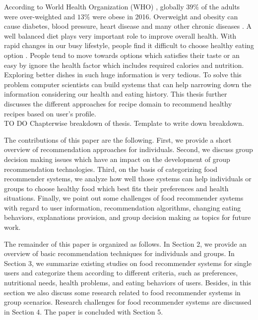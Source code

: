 According to World Health Organization (WHO) \cite{42}, globally $39\%$ of the adults were over-weighted and $13\%$ were obese in 2016. Overweight and obesity can cause diabetes, blood pressure, heart disease and many other chronic diseases \cite{43}. A well balanced diet plays very important role to improve overall health. With rapid changes in our busy lifestyle, people find it difficult to choose healthy eating option \cite{13}. People tend to move towards options which satisfies their taste or an easy by ignore the health factor which includes required calories and nutrition. Exploring better dishes in such huge information is very tedious. To solve this problem computer scientists can build systems that can help narrowing down the information considering our health and eating history. This thesis further discusses the different approaches for recipe domain to recommend healthy recipes based on user's profile.
\\

           TO DO        Chapterwise breakdown of thesis. Template to write down breakdown.

The contributions of this paper are the following. First, we provide a short overview of recommendation approaches for individuals. Second, we discuss group decision making issues which have an impact on the development of group recommendation technologies. Third, on the basis of categorizing food recommender systems, we analyze how well those systems can help individuals or groups to choose healthy food which best fits their preferences and health situations. Finally, we point out some challenges of food recommender systems with regard to user information, recommendation algorithms, changing eating behaviors, explanations provision, and group decision making as topics for future work.

The remainder of this paper is organized as follows. In Section 2, we provide an overview of basic recommendation techniques for individuals and groups. In Section 3, we summarize existing studies on food recommender systems for single users and categorize them according to different criteria, such as preferences, nutritional needs, health problems, and eating behaviors of users. Besides, in this section we also discuss some research related to food recommender systems in group scenarios. Research challenges for food recommender systems are discussed in Section 4. The paper is concluded with Section 5.


\pagebreak


